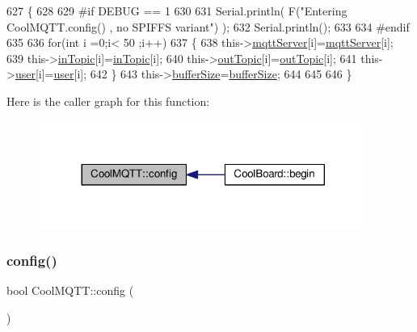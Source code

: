 \begin{DoxyCode}
627 \{
628 
629 \textcolor{preprocessor}{#if DEBUG == 1}
630 
631     Serial.println( F(\textcolor{stringliteral}{"Entering CoolMQTT.config() , no SPIFFS variant"}) );
632     Serial.println();
633 
634 \textcolor{preprocessor}{#endif}
635 
636     \textcolor{keywordflow}{for}(\textcolor{keywordtype}{int} i =0;i< 50 ;i++)
637     \{
638         this->\hyperlink{class_cool_m_q_t_t_ab8bb951f87ddbf92db74c2ad16a3e53e}{mqttServer}[i]=\hyperlink{class_cool_m_q_t_t_ab8bb951f87ddbf92db74c2ad16a3e53e}{mqttServer}[i];
639         this->\hyperlink{class_cool_m_q_t_t_a4492f52a441e83cc5151010317fdb52d}{inTopic}[i]=\hyperlink{class_cool_m_q_t_t_a4492f52a441e83cc5151010317fdb52d}{inTopic}[i];
640         this->\hyperlink{class_cool_m_q_t_t_a109c786a17b463f9eeba046194279522}{outTopic}[i]=\hyperlink{class_cool_m_q_t_t_a109c786a17b463f9eeba046194279522}{outTopic}[i];
641         this->\hyperlink{class_cool_m_q_t_t_a8cd47e45d457f908d4b4390b35aaee83}{user}[i]=\hyperlink{class_cool_m_q_t_t_a8cd47e45d457f908d4b4390b35aaee83}{user}[i];
642     \}
643     this->\hyperlink{class_cool_m_q_t_t_a7f3cf26b51d6770f216e42c5ef13ca9f}{bufferSize}=\hyperlink{class_cool_m_q_t_t_a7f3cf26b51d6770f216e42c5ef13ca9f}{bufferSize};
644     
645 
646 \}
\end{DoxyCode}
Here is the caller graph for this function\+:\nopagebreak
\begin{figure}[H]
\begin{center}
\leavevmode
\includegraphics[width=305pt]{d0/dd0/class_cool_m_q_t_t_a9b703de4f1358f0ee7a5e8c44979c648_icgraph}
\end{center}
\end{figure}
\mbox{\label{class_cool_m_q_t_t_a6571671781a505feca9a8a56e256c6bc}} 
\subsubsection{\texorpdfstring{config()}{config()}\hspace{0.1cm}{\footnotesize\ttfamily [2/2]}}
{\footnotesize\ttfamily bool Cool\+M\+Q\+T\+T\+::config (\begin{DoxyParamCaption}{ }\end{DoxyParamCaption})}

